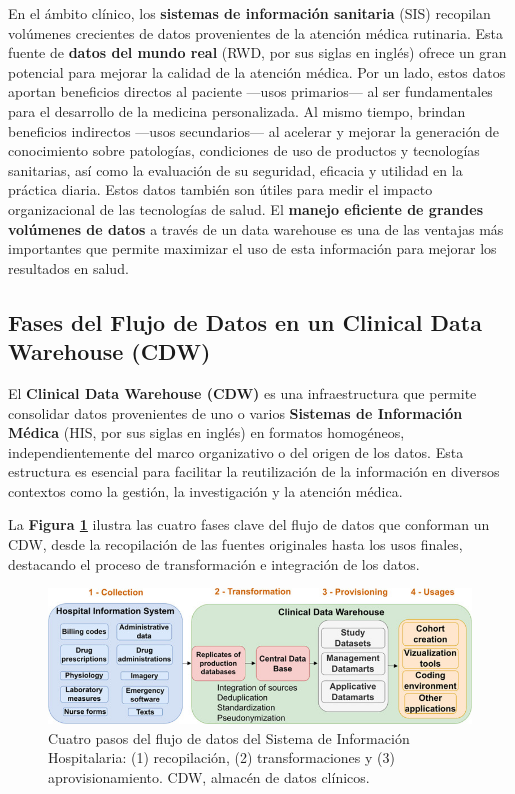 \documentclass[12pt, a4paper, twoside]{article}
\begin{document}
	En el ámbito clínico, los \textbf{sistemas de información sanitaria} (SIS) recopilan volúmenes crecientes de datos provenientes de la atención médica rutinaria. Esta fuente de \textbf{datos del mundo real} (RWD, por sus siglas en inglés) ofrece un gran potencial para mejorar la calidad de la atención médica. Por un lado, estos datos aportan beneficios directos al paciente —usos primarios— al ser fundamentales para el desarrollo de la medicina personalizada. Al mismo tiempo, brindan beneficios indirectos —usos secundarios— al acelerar y mejorar la generación de conocimiento sobre patologías, condiciones de uso de productos y tecnologías sanitarias, así como la evaluación de su seguridad, eficacia y utilidad en la práctica diaria. Estos datos también son útiles para medir el impacto organizacional de las tecnologías de salud. El \textbf{manejo eficiente de grandes volúmenes de datos} a través de un data warehouse es una de las ventajas más importantes que permite maximizar el uso de esta información para mejorar los resultados en salud.
	
	
	\subsection{Fases del Flujo de Datos en un Clinical Data Warehouse (CDW)}
	
	El \textbf{Clinical Data Warehouse (CDW)} es una infraestructura que permite consolidar datos provenientes de uno o varios \textbf{Sistemas de Información Médica} (HIS, por sus siglas en inglés) en formatos homogéneos, independientemente del marco organizativo o del origen de los datos. Esta estructura es esencial para facilitar la reutilización de la información en diversos contextos como la gestión, la investigación y la atención médica. \cite{doutreligne2023}
	
	La \textbf{Figura \ref{fig:Flujo}} ilustra las cuatro fases clave del flujo de datos que conforman un CDW, desde la recopilación de las fuentes originales hasta los usos finales, destacando el proceso de transformación e integración de los datos.
	
	\begin{figure}[h!]
		\includegraphics[width=1\textwidth]{image/Flujo.jpg}
		\caption{Cuatro pasos del flujo de datos del Sistema de Información Hospitalaria: (1) recopilación, (2) transformaciones y (3) aprovisionamiento. CDW, almacén de datos clínicos.\cite{doutreligne2023}}
		\label{fig:Flujo}
	\end{figure}
	
\end{document}
